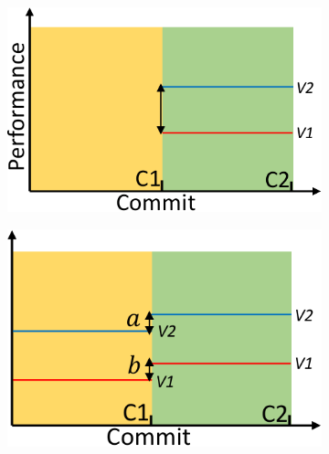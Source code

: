 \begin{figure}[t]
	\centering
        \begin{subfigure}{0.22\textwidth}
                \includegraphics[width=\linewidth]{Figures/background-a.pdf}
                \caption{}
                \label{fig:description-a}
        \end{subfigure}%
        \begin{subfigure}{0.22\textwidth}
                \includegraphics[width=\linewidth]{Figures/background-b.pdf}
                \caption{}
                \label{fig:description-b}
        \end{subfigure}
        \begin{subfigure}{0.22\textwidth}

\end{subfigure}
\end{figure}
